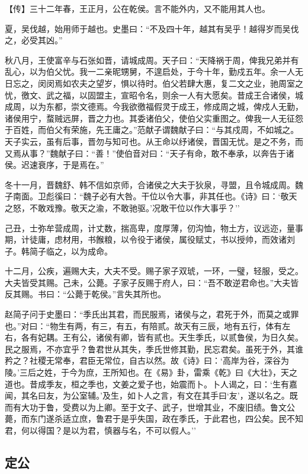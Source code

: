 \documentclass[]{article}
\begin{document}
【传】三十二年春，王正月，公在乾侯。言不能外内，又不能用其人也。

夏，吴伐越，始用师于越也。史墨曰：``不及四十年，越其有吴乎！越得岁而吴伐之，必受其凶。''

秋八月，王使富辛与石张如晋，请城成周。天子曰：``天降祸于周，俾我兄弟并有乱心，以为伯父忧。我一二亲昵甥舅，不遑启处，于今十年，勤戍五年。余一人无日忘之，闵闵焉如农夫之望岁，惧以待时。伯父若肆大惠，复二文之业，驰周室之忧，徼文、武之福，以固盟主，宣昭令名，则余一人有大愿矣。昔成王合诸侯，城成周，以为东都，崇文德焉。今我欲徼福假灵于成王，修成周之城，俾戍人无勤，诸侯用宁，蝥贼远屏，晋之力也。其委诸伯父，使伯父实重图之。俾我一人无征怨于百姓，而伯父有荣施，先王庸之。''范献子谓魏献子曰：``与其戍周，不如城之。天子实云，虽有后事，晋勿与知可也。从王命以纾诸侯，晋国无忧。是之不务，而又焉从事？''魏献子曰：``善！''使伯音对曰：``天子有命，敢不奉承，以奔告于诸侯。迟速衰序，于是焉在。''

冬十一月，晋魏舒、韩不信如京师，合诸侯之大夫于狄泉，寻盟，且令城成周。魏子南面。卫彪徯曰：``魏子必有大咎。干位以令大事，非其任也。《诗》曰：`敬天之怒，不敢戏豫。敬天之渝，不敢驰驱。'况敢干位以作大事乎？''

己丑，士弥牟营成周，计丈数，揣高卑，度厚薄，仞沟恤，物土方，议远迩，量事期，计徒庸，虑材用，书餱粮，以令役于诸侯，属役赋丈，书以授帅，而效诸刘子。韩简子临之，以为成命。

十二月，公疾，遍赐大夫，大夫不受。赐子家子双琥，一环，一璧，轻服，受之。大夫皆受其赐。己未，公薨。子家子反赐于府人，曰：``吾不敢逆君命也。''大夫皆反其赐。书曰：``公薨于乾侯。''言失其所也。

赵简子问于史墨曰：``季氏出其君，而民服焉，诸侯与之，君死于外，而莫之或罪也。''对曰：``物生有两，有三，有五，有陪贰。故天有三辰，地有五行，体有左右，各有妃耦。王有公，诸侯有卿，皆有贰也。天生季氏，以贰鲁侯，为日久矣。民之服焉，不亦宜乎？鲁君世从其失，季氏世修其勤，民忘君矣。虽死于外，其谁矜之？社稷无常奉，君臣无常位，自古以然。故《诗》曰：`高岸为谷，深谷为陵。'三后之姓，于今为庶，王所知也。在《易》卦，雷乘《乾》曰《大壮》，天之道也。昔成季友，桓之季也，文姜之爱子也，始震而卜。卜人谒之，曰：`生有嘉闻，其名曰友，为公室辅。'及生，如卜人之言，有文在其手曰`友'，遂以名之。既而有大功于鲁，受费以为上卿。至于文子、武子，世增其业，不废旧绩。鲁文公薨，而东门遂杀适立庶，鲁君于是乎失国，政在季氏，于此君也，四公矣。民不知君，何以得国？是以为君，慎器与名，不可以假人。''

\hypertarget{header-n2872}{%
\subsection{定公}\label{header-n2872}}
\end{document}
